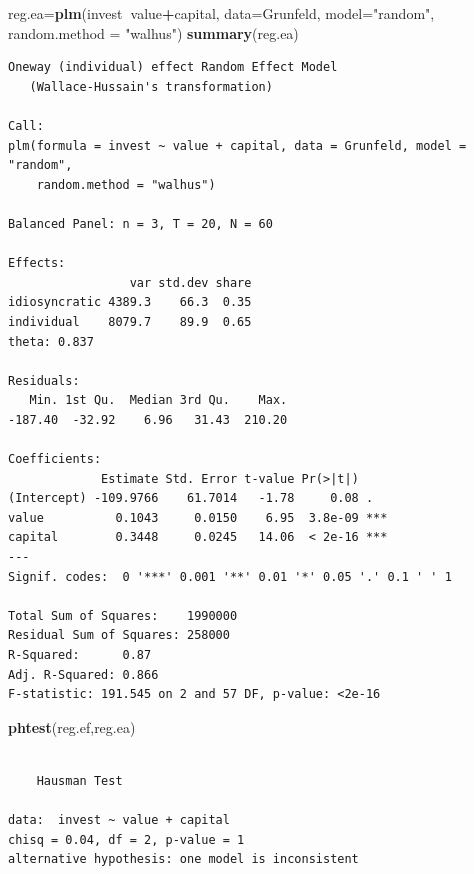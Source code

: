 \documentclass[12pt,brazil,oneside]{book}
\newenvironment{Shaded}{\begin{snugshade}}{\end{snugshade}}
\newcommand{\DataTypeTok}[1]{\textcolor[rgb]{0.13,0.29,0.53}{#1}}
\newcommand{\KeywordTok}[1]{\textcolor[rgb]{0.13,0.29,0.53}{\textbf{#1}}}
\newcommand{\NormalTok}[1]{#1}
\newcommand{\OperatorTok}[1]{\textcolor[rgb]{0.81,0.36,0.00}{\textbf{#1}}}
\newcommand{\StringTok}[1]{\textcolor[rgb]{0.31,0.60,0.02}{#1}}
\begin{document}
\begin{Shaded}
\begin{Highlighting}[]
\NormalTok{reg.ea=}\KeywordTok{plm}\NormalTok{(invest}\OperatorTok{~}\NormalTok{value}\OperatorTok{+}\NormalTok{capital,}
           \DataTypeTok{data=}\NormalTok{Grunfeld, }\DataTypeTok{model=}\StringTok{"random"}\NormalTok{, }
           \DataTypeTok{random.method =} \StringTok{"walhus"}\NormalTok{)}
\KeywordTok{summary}\NormalTok{(reg.ea)}
\end{Highlighting}
\end{Shaded}

\begin{verbatim}
Oneway (individual) effect Random Effect Model 
   (Wallace-Hussain's transformation)

Call:
plm(formula = invest ~ value + capital, data = Grunfeld, model = "random", 
    random.method = "walhus")

Balanced Panel: n = 3, T = 20, N = 60

Effects:
                 var std.dev share
idiosyncratic 4389.3    66.3  0.35
individual    8079.7    89.9  0.65
theta: 0.837

Residuals:
   Min. 1st Qu.  Median 3rd Qu.    Max. 
-187.40  -32.92    6.96   31.43  210.20 

Coefficients:
             Estimate Std. Error t-value Pr(>|t|)    
(Intercept) -109.9766    61.7014   -1.78     0.08 .  
value          0.1043     0.0150    6.95  3.8e-09 ***
capital        0.3448     0.0245   14.06  < 2e-16 ***
---
Signif. codes:  0 '***' 0.001 '**' 0.01 '*' 0.05 '.' 0.1 ' ' 1

Total Sum of Squares:    1990000
Residual Sum of Squares: 258000
R-Squared:      0.87
Adj. R-Squared: 0.866
F-statistic: 191.545 on 2 and 57 DF, p-value: <2e-16
\end{verbatim}

\begin{Shaded}
\begin{Highlighting}[]
\KeywordTok{phtest}\NormalTok{(reg.ef,reg.ea)}
\end{Highlighting}
\end{Shaded}

\begin{verbatim}

    Hausman Test

data:  invest ~ value + capital
chisq = 0.04, df = 2, p-value = 1
alternative hypothesis: one model is inconsistent
\end{verbatim}
\end{document}
